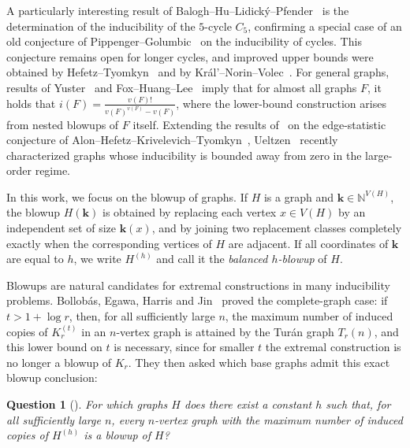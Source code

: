 \documentclass[10pt]{article}
\theoremstyle{plain}
\newtheorem{question}[question]{Question}
\theoremstyle{remark}
\begin{document}
A particularly interesting result of Balogh--Hu--Lidick\'y--Pfender~\cite{BaloghHuLidickyPfender} is the determination of the inducibility of the $5$-cycle $C_5$, confirming a special case of an old conjecture of Pippenger--Golumbic~\cite{PippengerGolumbic} on the inducibility of cycles. This conjecture remains open for longer cycles, and improved upper bounds were obtained by Hefetz--Tyomkyn~\cite{HefetzTyomkyn} and by Kr\'al'--Norin--Volec~\cite{KralNorinVolec}. For general graphs, results of Yuster~\cite{YusterAlmostAll} and Fox--Huang--Lee~\cite{FoxHuangLee} imply that for almost all graphs $F$, it holds that $i(F)=\frac{v(F)!}{v(F)^{v(F)}-v(F)}$, where the lower-bound construction arises from nested blowups of $F$ itself. Extending the results of~\cite{MMNT19,KST19,FS20} on the edge-statistic conjecture of Alon--Hefetz--Krivelevich--Tyomkyn~\cite{AHKT20}, Ueltzen~\cite{Uel24} recently characterized graphs whose inducibility is bounded away from zero in the large-order regime.

In this work, we focus on the blowup of graphs. If $H$ is a graph and $\mathbf k\in\mathbb N^{V(H)}$, the blowup $H(\mathbf k)$ is obtained by replacing each vertex $x\in V(H)$ by an independent set of size $\mathbf k(x)$, and by joining two replacement classes completely exactly when the corresponding vertices of $H$ are adjacent. If all coordinates of $\mathbf k$ are equal to $h$, we write $H^{(h)}$ and call it the \emph{balanced $h$-blowup} of $H$.

Blowups are natural candidates for extremal constructions in many inducibility problems.
Bollob\'as, Egawa, Harris and Jin~\cite{BollobasEgawaHarrisJin} proved the complete-graph case: if $t>1+\log r$, then, for all sufficiently large $n$, the maximum number of induced copies of $K_r^{(t)}$ in an $n$-vertex graph is attained by the Tur\'an graph $T_r(n)$, and this lower bound on $t$ is necessary, since for smaller $t$ the extremal construction is no longer a blowup of $K_r$. They then asked which base graphs admit this exact blowup conclusion:

\begin{question}[\cite{BollobasEgawaHarrisJin}]
For which graphs $H$ does there exist a constant $h$ such that, for all sufficiently large $n$, every $n$-vertex graph with the maximum number of induced copies of $H^{(h)}$ is a blowup of $H$?
\end{question}
\end{document}
